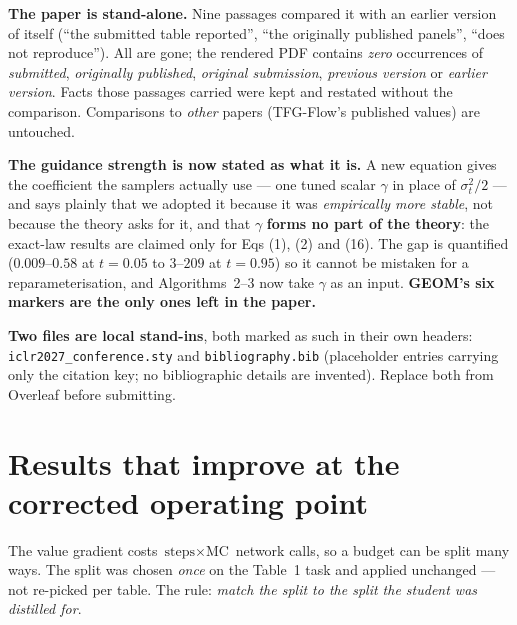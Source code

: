 \documentclass[10pt]{article}
\begin{document}
\noindent\textbf{The paper is stand-alone.} Nine passages compared it with an earlier version of
itself (``the submitted table reported'', ``the originally published panels'', ``does not
reproduce''). All are gone; the rendered PDF contains \emph{zero} occurrences of \emph{submitted},
\emph{originally published}, \emph{original submission}, \emph{previous version} or \emph{earlier
version}. Facts those passages carried were kept and restated without the comparison. Comparisons
to \emph{other} papers (TFG-Flow's published values) are untouched.

\noindent\textbf{The guidance strength is now stated as what it is.} A new equation gives the
coefficient the samplers actually use --- one tuned scalar $\gamma$ in place of $\sigma_t^2/2$ ---
and says plainly that we adopted it because it was \emph{empirically more stable}, not because the
theory asks for it, and that $\gamma$ \textbf{forms no part of the theory}: the exact-law results
are claimed only for Eqs (1), (2) and (16). The gap is quantified ($0.009$--$0.58$ at $t{=}0.05$ to
$3$--$209$ at $t{=}0.95$) so it cannot be mistaken for a reparameterisation, and Algorithms~2--3
now take $\gamma$ as an input. \textbf{GEOM's six markers are the only ones left in the paper.}

\noindent\textbf{Two files are local stand-ins}, both marked as such in their own headers:
\texttt{iclr2027\_conference.sty} and \texttt{bibliography.bib} (placeholder entries carrying only
the citation key; no bibliographic details are invented). Replace both from Overleaf before
submitting.

\section{Results that improve at the corrected operating point}

The value gradient costs $\text{steps}\times\text{MC}$ network calls, so a budget can be split many
ways. The split was chosen \emph{once} on the Table~1 task and applied unchanged --- not re-picked
per table. The rule: \emph{match the split to the split the student was distilled for}.
\end{document}
